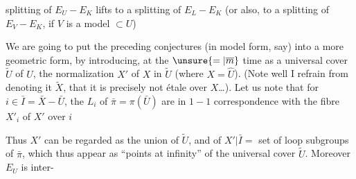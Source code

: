 splitting of $E_U-E_K$ lifts to a splitting of $E_L-E_K$ (or also,  to a splitting of $E_V-E_K$, if $V$ is a model $\subset U$)

We are going to put the preceding conjectures (in model form, say) into a more geometric form, by introducing, at the $\unsure{=|\overline m}$ time as a universal cover  $\widetilde U$ of $U$, the normalization  $X'$ of $X$ in $\widetilde U$ (where $X=\widehat U$). (Note well I refrain from denoting it $\widetilde X$,  that it is precisely not étale over $X$\ldots). Let us note that for $i\in\bar I=\bar X-\bar U$, the  $L_i$ of $\bar\pi=\pi(\bar U)$ are in $1-1$ correspondence with the  fibre $X'_i$ of $X'$ over $i$


Thus $X'$ can be regarded as the union of $\widetilde U$, and of $X'|\bar I=$ set of loop subgroups of $\bar\pi$, which thus appear as ``points at infinity'' of the universal cover $\widetilde U$. Moreover $E_U$ is inter-
